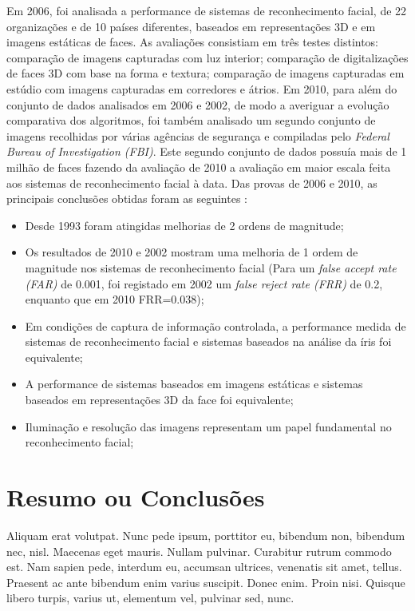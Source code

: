 Em 2006, foi analisada a performance de sistemas de reconhecimento facial, de 22 organizações e de 10 países diferentes, baseados em representações 3D e em imagens estáticas de faces. As avaliações consistiam em três testes distintos: comparação de imagens capturadas com luz interior; comparação de digitalizações de faces 3D com base na forma e textura; comparação de imagens capturadas em estúdio com imagens capturadas em corredores e átrios. Em 2010, para além do conjunto de dados analisados em 2006 e 2002, de modo a averiguar a evolução comparativa dos algoritmos, foi também analisado um segundo conjunto de imagens recolhidas por várias agências de segurança e compiladas pelo \textit{Federal Bureau of Investigation (FBI)}. Este segundo conjunto de dados possuía mais de 1 milhão de faces fazendo da avaliação de 2010 a avaliação em maior escala feita aos sistemas de reconhecimento facial à data. Das provas de 2006 e 2010, as principais conclusões obtidas foram as seguintes \cite{Phillips2007, Grother2010, Chellappa2010, Li2011}:
\begin{itemize}
\item Desde 1993 foram atingidas melhorias de 2 ordens de magnitude;
\item Os resultados de 2010 e 2002 mostram uma melhoria de 1 ordem de magnitude nos sistemas de reconhecimento facial (Para um \textit{false accept rate (FAR)} de 0.001, foi registado em 2002 um \textit{false reject rate (FRR)} de 0.2, enquanto que em 2010 FRR=0.038);
\item Em condições de captura de informação controlada, a performance medida de sistemas de reconhecimento facial e sistemas baseados na análise da íris foi equivalente;
\item A performance de sistemas baseados em imagens estáticas e sistemas baseados em representações 3D da face foi equivalente;
\item Iluminação e resolução das imagens representam um papel fundamental no reconhecimento facial;
\end{itemize}

\section{Resumo ou Conclusões}

Aliquam erat volutpat. Nunc pede ipsum, porttitor eu, bibendum non,
bibendum nec, nisl. Maecenas eget mauris. Nullam pulvinar. Curabitur
rutrum commodo est. Nam sapien pede, interdum eu, accumsan ultrices,
venenatis sit amet, tellus. Praesent ac ante bibendum enim varius
suscipit. Donec enim. Proin nisi. Quisque libero turpis, varius ut,
elementum vel, pulvinar sed, nunc. 

